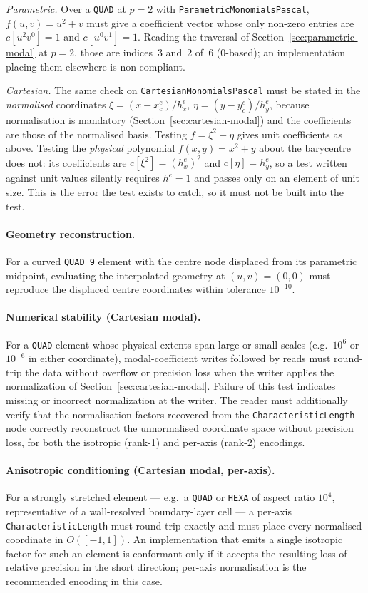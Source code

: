\documentclass[11pt,letterpaper]{article}
\newif\ifvfourdraft
\newcommand{\vfour}[1]{\ifvfourdraft\textcolor{v4violet}{#1}\else#1\fi}
\begin{document}
\vfour{\emph{Parametric.}  Over a \texttt{QUAD} at $p=2$ with
\texttt{ParametricMonomialsPascal}, $f(u,v) = u^2 + v$ must give a coefficient
vector whose only non-zero entries are $c[u^2v^0]=1$ and $c[u^0v^1]=1$.  Reading
the traversal of Section~\ref{sec:parametric-modal} at $p=2$, those are indices~3
and~2 of~6 (0-based); an implementation placing them elsewhere is non-compliant.}

\vfour{\emph{Cartesian.}  The same check on \texttt{CartesianMonomialsPascal}
must be stated in the \emph{normalised} coordinates
$\xi = (x-x^e_c)/h^e_x$, $\eta = (y-y^e_c)/h^e_y$, because normalisation is
mandatory (Section~\ref{sec:cartesian-modal}) and the coefficients are those of
the normalised basis.  Testing $f = \xi^2 + \eta$ gives unit coefficients as
above.  Testing the \emph{physical} polynomial $f(x,y) = x^2 + y$ about the
barycentre does not: its coefficients are $c[\xi^2] = (h^e_x)^2$ and
$c[\eta] = h^e_y$, so a test written against unit values silently requires
$h^e = 1$ and passes only on an element of unit size.  This is the error the test
exists to catch, so it must not be built into the test.}

\paragraph{Geometry reconstruction.}
For a curved \texttt{QUAD\_9} element with the centre node displaced from its parametric
midpoint, evaluating the interpolated geometry at $(u,v)=(0,0)$ must reproduce the displaced
centre coordinates within tolerance $10^{-10}$.

\paragraph{Numerical stability (Cartesian modal).}
For a \texttt{QUAD} element whose physical extents span large or small scales (e.g.\
$10^{6}$ or $10^{-6}$ in either coordinate), modal-coefficient writes followed by reads
must round-trip the data without overflow or precision loss when the writer applies
the normalization of Section~\ref{sec:cartesian-modal}.  Failure of this test indicates
missing or incorrect normalization at the writer.  The reader must additionally verify
that the normalisation factors recovered from the \texttt{CharacteristicLength} node
correctly reconstruct the unnormalised coordinate space without precision loss, for
both the isotropic (rank-1) and per-axis (rank-2) encodings.

\paragraph{Anisotropic conditioning (Cartesian modal, per-axis).}
For a strongly stretched element --- e.g.\ a \texttt{QUAD} or \texttt{HEXA} of aspect
ratio $10^{4}$, representative of a wall-resolved boundary-layer cell --- a per-axis
\texttt{CharacteristicLength} must round-trip exactly and must place every normalised
coordinate in $O([-1,1])$.  An implementation that emits a single isotropic factor for
such an element is conformant only if it accepts the resulting loss of relative
precision in the short direction; per-axis normalisation is the recommended encoding
in this case.
\end{document}

